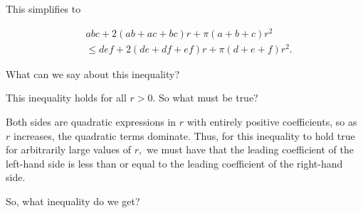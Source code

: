 
This simplifies to


\begin{equation*}  
\begin{split}  
&abc + 2(ab + ac + bc) r + \pi (a + b + c) r^2 \\  
&\le def + 2(de + df + ef) r + \pi (d + e + f) r^2.  
\end{split}  
\end{equation*}

What can we say about this inequality?


This inequality holds for all $r > 0.$  So what must be true?


Both sides are quadratic expressions in $r$ with entirely positive coefficients, so as $r$ increases, the quadratic terms dominate. Thus, for this inequality to hold true for arbitrarily large values of $r,$ we must have that the leading coefficient of the left-hand side is less than or equal to the leading coefficient of the right-hand side.

So, what inequality do we get?









